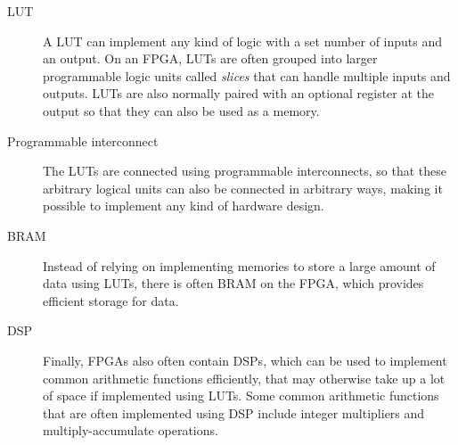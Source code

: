 \begin{description}
\item[\Gls{LUT}] A \gls{LUT} can implement any kind of logic with a set number
  of inputs and an output.  On an \gls{FPGA}, \glspl{LUT} are often grouped into
  larger programmable logic units called \emph{slices} that can handle multiple
  inputs and outputs.  \Glspl{LUT} are also normally paired with an optional
  register at the output so that they can also be used as a memory.
\item[Programmable interconnect] The \glspl{LUT} are connected using
  programmable interconnects, so that these arbitrary logical units can also be
  connected in arbitrary ways, making it possible to implement any kind of
  hardware design.
\item[\Gls{BRAM}] Instead of relying on implementing memories to store a large
  amount of data using \glspl{LUT}, there is often \gls{BRAM} on the \gls{FPGA},
  which provides efficient storage for data.
\item[\Gls{DSP}] Finally, \glspl{FPGA} also often contain \glspl{DSP}, which can
  be used to implement common arithmetic functions efficiently, that may
  otherwise take up a lot of space if implemented using \glspl{LUT}.  Some
  common arithmetic functions that are often implemented using \gls{DSP} include
  integer multipliers and multiply-accumulate operations.
\end{description}


